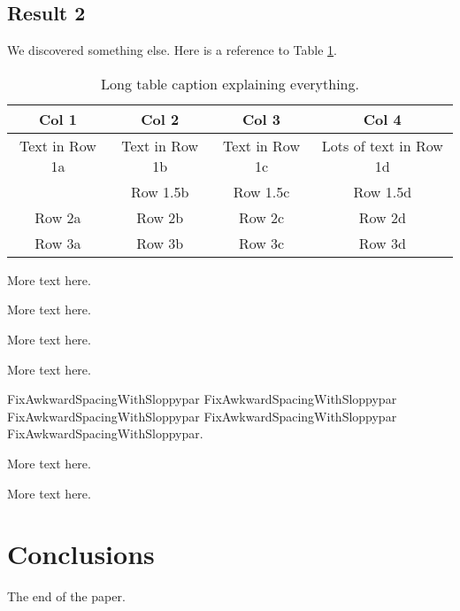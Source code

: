 \subsection{Result 2}
We discovered something else. Here is a reference to Table \ref{tab:paper1_tab1}.

\renewcommand{\arraystretch}{2}  %
\begin{table}[hbt!]
\centering
\begin{tabularx}{\textwidth}{c|c|c|c}  %
   \textbf{Col 1} & \textbf{Col 2} & \textbf{Col 3} & \textbf{Col 4} \\
   \hline  %
   Text in Row 1a & Text in Row 1b & Text in Row 1c & Lots of text in Row 1d \\
                  & Row 1.5b & Row 1.5c & Row 1.5d \\
   \hline
   Row 2a & Row 2b & Row 2c & Row 2d \\
   \hline
   Row 3a & Row 3b & Row 3c & Row 3d \\
\end{tabularx}
\caption[Short table caption for List of Tables]{Long table caption explaining everything.}
\label{tab:paper1_tab1}
\end{table}

More text here.

More text here.

More text here.

More text here.

\begin{sloppypar}
FixAwkwardSpacingWithSloppypar FixAwkwardSpacingWithSloppypar FixAwkwardSpacingWithSloppypar FixAwkwardSpacingWithSloppypar FixAwkwardSpacingWithSloppypar.
\end{sloppypar}

More text here.

More text here.

\section{Conclusions}
The end of the paper.
